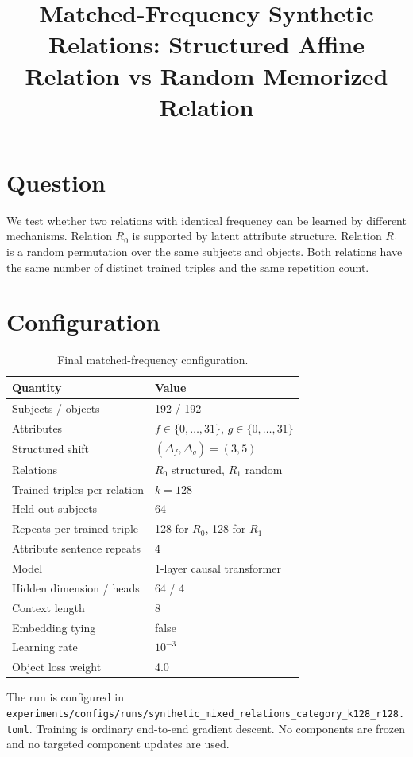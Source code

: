 \documentclass[11pt]{article}
\title{Matched-Frequency Synthetic Relations: Structured Affine Relation vs Random Memorized Relation}
\author{}
\date{}
\begin{document}
\maketitle

\section{Question}

We test whether two relations with identical frequency can be learned by different
mechanisms.  Relation \(R_0\) is supported by latent attribute structure. Relation
\(R_1\) is a random permutation over the same subjects and objects. Both relations
have the same number of distinct trained triples and the same repetition count.

\section{Configuration}

\begin{table}[h]
\centering
\begin{tabular}{ll}
\toprule
Quantity & Value \\
\midrule
Subjects / objects & 192 / 192 \\
Attributes & \(f \in \{0,\ldots,31\}\), \(g \in \{0,\ldots,31\}\) \\
Structured shift & \((\Delta_f,\Delta_g) = (3,5)\) \\
Relations & \(R_0\) structured, \(R_1\) random \\
Trained triples per relation & \(k = 128\) \\
Held-out subjects & 64 \\
Repeats per trained triple & 128 for \(R_0\), 128 for \(R_1\) \\
Attribute sentence repeats & 4 \\
Model & 1-layer causal transformer \\
Hidden dimension / heads & 64 / 4 \\
Context length & 8 \\
Embedding tying & false \\
Learning rate & \(10^{-3}\) \\
Object loss weight & 4.0 \\
\bottomrule
\end{tabular}
\caption{Final matched-frequency configuration.}
\end{table}

The run is configured in
\texttt{experiments/configs/runs/synthetic\_mixed\_relations\_category\_k128\_r128.toml}.
Training is ordinary end-to-end gradient descent. No components are frozen and no
targeted component updates are used.
\end{document}
